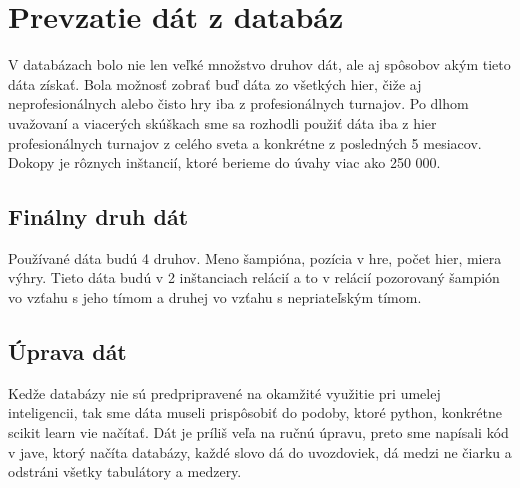 \section{Prevzatie dát z databáz}
V databázach bolo nie len veľké množstvo druhov dát, ale aj spôsobov akým tieto dáta získať. Bola možnosť zobrať buď dáta zo všetkých hier, čiže aj neprofesionálnych alebo čisto hry iba z profesionálnych turnajov. Po dlhom uvažovaní a viacerých skúškach sme sa rozhodli použiť dáta iba z hier profesionálnych turnajov z celého sveta a konkrétne z posledných 5 mesiacov. Dokopy je rôznych inštancií, ktoré berieme do úvahy viac ako 250 000.

\subsection{Finálny druh dát}
Používané dáta budú 4 druhov. Meno šampióna, pozícia v hre, počet hier, miera výhry. Tieto dáta budú v 2 inštanciach relácií a to v relácií pozorovaný šampión vo vzťahu s jeho tímom a druhej vo vzťahu s nepriateľským tímom.

\subsection{Úprava dát}
Kedže databázy nie sú predpripravené na okamžité využitie pri umelej inteligencii, tak sme dáta museli prispôsobiť do podoby, ktoré python, konkrétne scikit learn vie načítať. Dát je príliš veľa na ručnú úpravu, preto sme napísali kód v jave, ktorý načíta databázy, každé slovo dá do uvozdoviek, dá medzi ne čiarku a odstráni všetky tabulátory a medzery.

